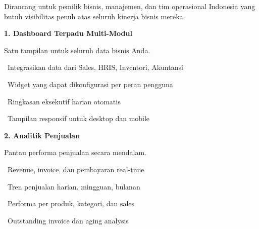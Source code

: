 \documentclass[a4paper]{article}
\begin{document}
{\fontsize{9.5}{13}\selectfont\color{TextLight}
Dirancang untuk pemilik bisnis, manajemen, dan tim operasional Indonesia yang butuh visibilitas penuh atas seluruh kinerja bisnis mereka.}

\vspace{6pt}

\noindent
\begin{minipage}[t]{0.485\textwidth}
    \colorbox{IndigoPrimary}{%
        \begin{minipage}{\dimexpr\textwidth-14pt}
            \vspace{5pt}
            {\fontsize{10}{13}\selectfont\bfseries\color{White} 1. Dashboard Terpadu Multi-Modul}
            \vspace{5pt}
        \end{minipage}}
    \vspace{5pt}
    {\fontsize{9}{12}\selectfont\color{TextDark}%
    Satu tampilan untuk seluruh data bisnis Anda.\par\vspace{3pt}
    \textbullet\ Integrasikan data dari Sales, HRIS, Inventori, Akuntansi\par\vspace{2pt}%
    \textbullet\ Widget yang dapat dikonfigurasi per peran pengguna\par\vspace{2pt}%
    \textbullet\ Ringkasan eksekutif harian otomatis\par\vspace{2pt}%
    \textbullet\ Tampilan responsif untuk desktop dan mobile}%
\end{minipage}%
\hfill
\begin{minipage}[t]{0.485\textwidth}
    \colorbox{BluePrimary}{%
        \begin{minipage}{\dimexpr\textwidth-14pt}
            \vspace{5pt}
            {\fontsize{10}{13}\selectfont\bfseries\color{White} 2. Analitik Penjualan}
            \vspace{5pt}
        \end{minipage}}
    \vspace{5pt}
    {\fontsize{9}{12}\selectfont\color{TextDark}%
    Pantau performa penjualan secara mendalam.\par\vspace{3pt}
    \textbullet\ Revenue, invoice, dan pembayaran real-time\par\vspace{2pt}%
    \textbullet\ Tren penjualan harian, mingguan, bulanan\par\vspace{2pt}%
    \textbullet\ Performa per produk, kategori, dan sales\par\vspace{2pt}%
    \textbullet\ Outstanding invoice dan aging analysis}%
\end{minipage}
\end{document}
